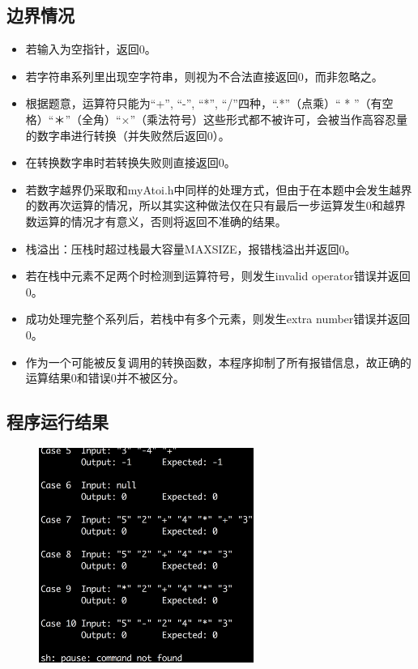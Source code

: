 \documentclass{homework}
\begin{document}
\subsection{边界情况}
\begin{itemize}
    \item 若输入为空指针，返回0。
    \item 若字符串系列里出现空字符串，则视为不合法直接返回0，而非忽略之。
    \item 根据题意，运算符只能为“+”, “-”, “*”, “/”四种，“.*”（点乘）“  *  ”（有空格）“＊”（全角）“×”（乘法符号）这些形式都不被许可，会被当作高容忍量的数字串进行转换（并失败然后返回0）。
    \item 在转换数字串时若转换失败则直接返回0。
    \item 若数字越界仍采取和myAtoi.h中同样的处理方式，但由于在本题中会发生越界的数再次运算的情况，所以其实这种做法仅在只有最后一步运算发生0和越界数运算的情况才有意义，否则将返回不准确的结果。
    \item 栈溢出：压栈时超过栈最大容量MAXSIZE，报错栈溢出并返回0。
    \item 若在栈中元素不足两个时检测到运算符号，则发生invalid operator错误并返回0。
    \item 成功处理完整个系列后，若栈中有多个元素，则发生extra number错误并返回0。
    \item 作为一个可能被反复调用的转换函数，本程序抑制了所有报错信息，故正确的运算结果0和错误0并不被区分。
\end{itemize}
\subsection{程序运行结果}
\begin{figure}[H]
    \centering
    \includegraphics[width=7cm]{eval.png}
\end{figure}
\end{document}
